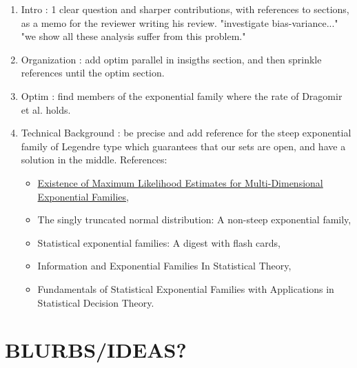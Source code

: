 \documentclass[twoside]{article}
\let\oldsection\section
\renewcommand{\section}[1]{\oldsection{\texorpdfstring{\uppercase{#1}}{#1}}}
\begin{document}
\begin{enumerate}
	\item Intro : 1 clear question and sharper contributions, with references to sections, as a memo for the reviewer writing his review. "investigate bias-variance..." "we show all these analysis suffer from this problem."
	\item Organization : add optim parallel in insigths section, and then sprinkle references until the optim section.
	\item Optim : find members of the exponential family where the rate of Dragomir et al. holds.
	\item Technical Background : be precise and add reference for the steep exponential family of Legendre type which guarantees that our sets are open, and have a solution in the middle.
	References: \begin{itemize}
		\item \href{https://www.jstor.org/stable/4616462?seq=1#metadata_info_tab_contents}{Existence of Maximum Likelihood Estimates for Multi-Dimensional Exponential Families},
		\item The singly truncated normal distribution: A non-steep exponential family,
		\item Statistical exponential families: A digest with flash cards,
		\item Information and Exponential Families In Statistical Theory,
		\item Fundamentals of Statistical Exponential Families with Applications in Statistical Decision Theory.
	\end{itemize}
\end{enumerate}




\section{Blurbs/ideas?}
\end{document}
